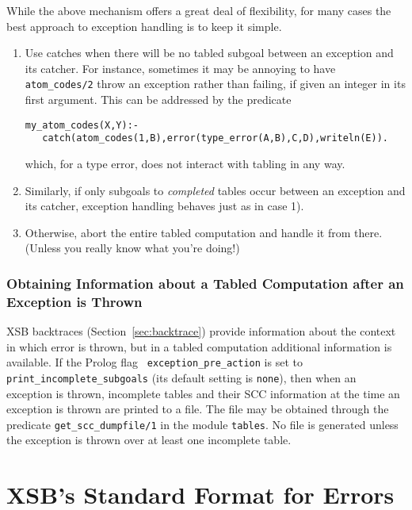While the above mechanism offers a great deal of flexibility, for many
cases the best approach to exception handling is to keep it simple.
%
\begin{enumerate}
\item Use catches when there will be no tabled subgoal between an
  exception and its catcher.  For instance, sometimes it may be
  annoying to have {\tt atom\_codes/2} throw an exception rather than
  failing, if given an integer in its first argument.  This can be
  addressed by the predicate
%
\begin{verbatim}
my_atom_codes(X,Y):- 
   catch(atom_codes(1,B),error(type_error(A,B),C,D),writeln(E)).
\end{verbatim}
%
which, for a type error, does not interact with tabling in any way.  
%
\item Similarly, if only subgoals to {\em completed} tables occur
  between an exception and its catcher, exception handling behaves
  just as in case 1).
%
\item Otherwise, abort the entire tabled computation and handle it
  from there.  (Unless you really know what you're doing!)
\end{enumerate}
%

\subsubsection{Obtaining Information about a Tabled Computation after an Exception is Thrown}
%
XSB backtraces (Section~\ref{sec:backtrace}) provide information about
the context in which error is thrown, but in a tabled computation
additional information is available.  If the Prolog flag {\tt
  exception\_pre\_action} is set to {\tt print\_incomplete\_subgoals}
(its default setting is {\tt none}), then when an exception is thrown,
incomplete tables and their SCC information at the time an exception
is thrown are printed to a file.  The file may be obtained through the
predicate {\tt get\_scc\_dumpfile/1} in the module {\tt tables}.  No
file is generated unless the exception is thrown over at least one
incomplete table.

\section{XSB's Standard Format for Errors} \label{sec:iso-errors}

